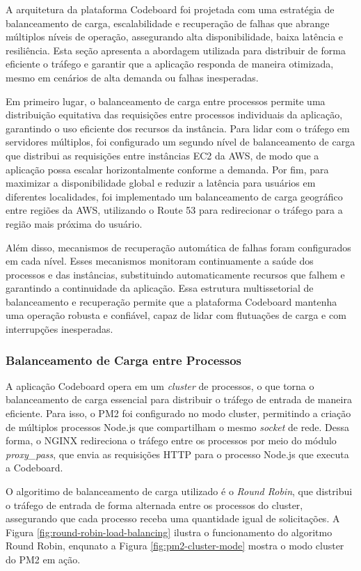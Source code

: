 A arquitetura da plataforma Codeboard foi projetada com uma estratégia de balanceamento de carga, escalabilidade e recuperação de falhas que abrange múltiplos níveis de operação, assegurando alta disponibilidade, baixa latência e resiliência. Esta seção apresenta a abordagem utilizada para distribuir de forma eficiente o tráfego e garantir que a aplicação responda de maneira otimizada, mesmo em cenários de alta demanda ou falhas inesperadas.

Em primeiro lugar, o balanceamento de carga entre processos permite uma distribuição equitativa das requisições entre processos individuais da aplicação, garantindo o uso eficiente dos recursos da instância. Para lidar com o tráfego em servidores múltiplos, foi configurado um segundo nível de balanceamento de carga que distribui as requisições entre instâncias EC2 da AWS, de modo que a aplicação possa escalar horizontalmente conforme a demanda. Por fim, para maximizar a disponibilidade global e reduzir a latência para usuários em diferentes localidades, foi implementado um balanceamento de carga geográfico entre regiões da AWS, utilizando o Route 53 para redirecionar o tráfego para a região mais próxima do usuário.

Além disso, mecanismos de recuperação automática de falhas foram configurados em cada nível. Esses mecanismos monitoram continuamente a saúde dos processos e das instâncias, substituindo automaticamente recursos que falhem e garantindo a continuidade da aplicação. Essa estrutura multissetorial de balanceamento e recuperação permite que a plataforma Codeboard mantenha uma operação robusta e confiável, capaz de lidar com flutuações de carga e com interrupções inesperadas.

\subsubsection{Balanceamento de Carga entre Processos}

A aplicação Codeboard opera em um \emph{cluster} de processos, o que torna o balanceamento de carga essencial para distribuir o tráfego de entrada de maneira eficiente. Para isso, o PM2 foi configurado no modo cluster, permitindo a criação de múltiplos processos Node.js que compartilham o mesmo \emph{socket} de rede. Dessa forma, o NGINX redireciona o tráfego entre os processos por meio do módulo \emph{proxy\_pass}, que envia as requisições HTTP para o processo Node.js que executa a Codeboard.

O algoritimo de balanceamento de carga utilizado é o \emph{Round Robin}, que distribui o tráfego de entrada de forma alternada entre os processos do cluster, assegurando que cada processo receba uma quantidade igual de solicitações. A Figura \ref{fig:round-robin-load-balancing} ilustra o funcionamento do algoritmo Round Robin, enqunato a Figura \ref{fig:pm2-cluster-mode} mostra o modo cluster do PM2 em ação.

